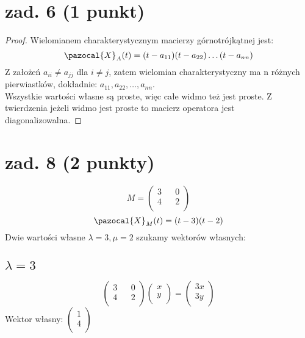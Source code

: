 \documentclass{article}
\begin{document}
\section{zad. 6 (1 punkt)}
\begin{proof}
Wielomianem charakterystycznym macierzy górnotrójkątnej jest:
$$
\pazocal{X}_A(t) =(t - a_{11})(t - a_{22})\dots(t - a_{nn})
$$
Z założeń $a_{ii} \neq a_{jj}$ dla $i \neq j$, zatem wielomian charakterystyczny ma n różnych pierwiastków, dokładnie: $a_{11},a_{22},\dots,a_{nn}$.\\
Wszystkie wartości własne są proste, więc całe widmo też jest proste. Z twierdzenia jeżeli widmo jest proste to macierz operatora jest diagonalizowalna.
\end{proof}
\section{zad. 8 (2 punkty)}
$$M =
\begin{pmatrix}
3 && 0\\
4 && 2\\
\end{pmatrix}
$$
$$
\pazocal{X}_M(t) =(t-3)(t-2)
$$
Dwie wartości własne $\lambda = 3, \mu = 2$ szukamy wektorów własnych:
\subsection*{$\lambda = 3$}
$$
\begin{pmatrix}
3 && 0\\
4 && 2\\
\end{pmatrix}
\begin{pmatrix}
x\\
y\\
\end{pmatrix}
=
\begin{pmatrix}
3x\\
3y\\
\end{pmatrix}
$$
Wektor własny: $\begin{pmatrix}
1\\
4\\
\end{pmatrix}$
\end{document}
